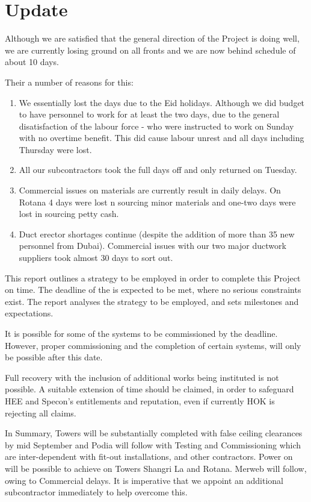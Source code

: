 
\cleardoublepage

\chapter*{Update}

Although we are satisfied that the general direction of the Project is doing well, we are currently losing ground on all fronts and we are now behind schedule of about 10 days.

Their a number of reasons for this:

\begin{enumerate}
\item We essentially lost the days due to the Eid holidays. Although we did budget to have personnel to work for at least the two days, due to the general disatisfaction of the labour force - who were instructed to work on Sunday with no overtime benefit. This did cause labour unrest and all days including Thursday were lost.
\item All our subcontractors took the full days off and only returned on Tuesday.
\item Commercial issues on materials are currently result in daily delays. On Rotana 4 days were lost n sourcing minor materials and one-two days were lost in sourcing petty cash.
\item Duct erector shortages continue (despite the addition of more than 35 new personnel from Dubai). Commercial issues with our two major ductwork suppliers took almost 30 days to sort out. 
\end{enumerate}

This report outlines a strategy to be employed in order to complete this Project on time. The deadline of the \protect\deadline  is expected to be met, where no serious constraints exist. The report analyses the strategy to be employed, and sets milestones and expectations. 

It is possible for some of the systems to be commissioned by the deadline. However, proper commissioning and the completion of certain systems, will only be possible after this date. 

Full recovery with the inclusion of additional works being instituted is not possible. A suitable extension of time should be claimed, in order to safeguard HEE and Specon's entitlements and reputation, even if currently HOK is rejecting all claims. 

In Summary, Towers will be substantially completed with false ceiling clearances by mid September and Podia will follow with Testing and Commissioning which are inter-dependent with fit-out installations, and other contractors. Power on will be possible to achieve on Towers Shangri La and Rotana. Merweb will follow, owing to Commercial delays. It is imperative that we appoint an additional subcontractor immediately to help overcome this.

